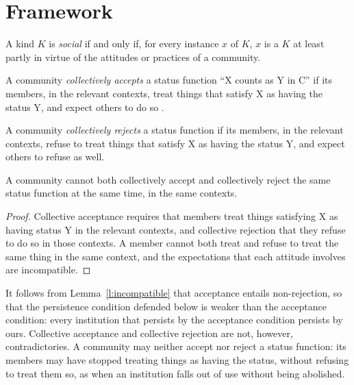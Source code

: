 \documentclass{situationist-preprint}
\begin{document}
\section{Framework}

\begin{definition}\label{d:social}
A kind $K$ is \emph{social} if and only if, for every instance $x$ of $K$, $x$ is a $K$ at least partly in virtue of the attitudes or practices of a community.
\end{definition}

\begin{definition}\label{d:accept}
A community \emph{collectively accepts} a status function \enquote{X counts as Y in C} if its members, in the relevant contexts, treat things that satisfy X as having the status Y, and expect others to do so \citep{Searle1995}.
\end{definition}

\begin{definition}\label{d:reject}
A community \emph{collectively rejects} a status function if its members, in the relevant contexts, refuse to treat things that satisfy X as having the status Y, and expect others to refuse as well.
\end{definition}

\begin{lemma}\label{l:incompatible}
A community cannot both collectively accept and collectively reject the same status function at the same time, in the same contexts.
\end{lemma}

\begin{proof}
Collective acceptance requires that members treat things satisfying X as having status Y in the relevant contexts, and collective rejection that they refuse to do so in those contexts. A member cannot both treat and refuse to treat the same thing in the same context, and the expectations that each attitude involves are incompatible.
\end{proof}

It follows from Lemma~\ref{l:incompatible} that acceptance entails non-rejection, so that the persistence condition defended below is weaker than the acceptance condition: every institution that persists by the acceptance condition persists by ours. Collective acceptance and collective rejection are not, however, contradictories. A community may neither accept nor reject a status function: its members may have stopped treating things as having the status, without refusing to treat them so, as when an institution falls out of use without being abolished.
\end{document}
